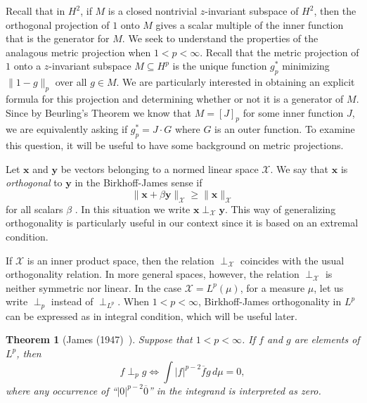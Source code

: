 \documentclass{article}
\theoremstyle{plain}
\newtheorem{Theorem}{Theorem}
\numberwithin{Theorem}{section}
\numberwithin{equation}{section}
\theoremstyle{plain}
\theoremstyle{definition}
\renewcommand{\geq}{\geqslant}
\begin{document}
Recall that in $H^2$, if $M$ is a closed nontrivial $z$-invariant subspace of $H^2$, then the orthogonal projection of $1$ onto $M$ gives a scalar multiple of the inner function that is the generator for $M$. We seek to understand the properties of the analagous metric projection when $1 < p < \infty$. 
Recall that the metric projection of $1$ onto a $z$-invariant subspace $M \subseteq H^p$ is the unique function $g_p^*$ minimizing $\| 1 - g\|_p$ over all $g \in M$. We are particularly interested in obtaining an explicit formula for this projection and determining whether or not it is a generator of $M$. Since by Beurling's Theorem we know that $M = [J]_p$ for some inner function $J$, we are equivalently asking if $g_p^* = J \cdot G$ where $G$ is an outer function. To examine this question, it will be useful to have some background on metric projections. 



Let $\mathbf{x}$ and $\mathbf{y}$ be vectors belonging to a normed linear space $\mathscr{X}$.  We say that $\mathbf{x}$ is \textit{orthogonal} to $\mathbf{y}$ in the Birkhoff-James sense   if
 \[    \|  \mathbf{x} + \beta \mathbf{y} \|_{\mathscr{X}} \geq \|\mathbf{x}\|_{\mathscr{X}}  \]
for all scalars $\beta$ \cite{Bir,Jam}. 
In this situation we write $\mathbf{x} \perp_{\mathscr{X}} \mathbf{y}$.
This way of generalizing orthogonality is particularly useful in our context since it is based on an extremal condition.

If $\mathscr{X}$ is an inner product space, then the relation $ \perp_{\mathscr{X}} $ coincides with the usual orthogonality relation.  In more general spaces, however, the relation $\perp_{\mathscr{X}}$ is neither symmetric nor linear.  In the case $\mathscr{X} = L^p(\mu)$, for a measure $\mu$,  let us write $\perp_p$ instead of  $\perp_{L^p}$.
When $1<p<\infty$, Birkhoff-James orthogonality in $L^p$ can be expressed as in integral condition, which will be useful later. 

\begin{Theorem}[James (1947)\ \cite{Jam}]\label{praccritperp}
Suppose that $1<p<\infty$.  If $f$ and $g$ are elements of $L^p$, then 
\begin{equation}\label{BJp}
 {f} \perp_{p} {g}  \iff   \int |f|^{p - 2} \overline{f} g \,d\mu  = 0,
\end{equation}
where any occurrence of ``$|0|^{p - 2} \overline{0}$'' in the integrand is interpreted as zero.
\end{Theorem}
\end{document}
